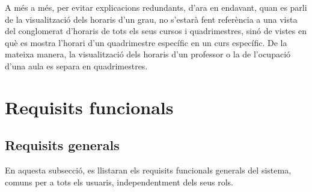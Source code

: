 \documentclass[a4paper,12pt]{ThesisStyle}
\begin{document}
A més a més, per evitar explicacions redundants, d'ara en endavant, quan es parli de la visualització dels horaris d'un grau, no s'estarà fent referència a una vista del conglomerat d'horaris de tots els seus cursos i quadrimestres, sinó de vistes en què es mostra l'horari d'un quadrimestre específic en un curs específic. De la mateixa manera, la visualització dels horaris d'un professor o la de l'ocupació d'una aula es separa en quadrimestres.

\section{Requisits funcionals}
\label{sec:requisits_funcionals}

\subsection{Requisits generals}
\label{subsec:requisits_generals}

En aquesta subsecció, es llistaran els requisits funcionals generals del sistema, comuns per a tots els usuaris, independentment dels seus rols.
\end{document}
